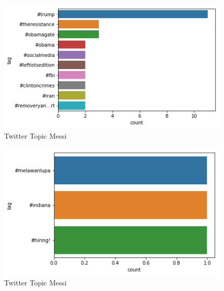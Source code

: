 \begin{figure}[htbp]\label{fig:twitter-out-3}
\centering
\includegraphics[width=1.0\textwidth]{images/twitter-trump-output.png}
\caption{Twitter Topic Messi}
\end{figure}


\begin{figure}[htbp]\label{fig:twitter-out-4}
\centering
\includegraphics[width=1.0\textwidth]{images/twitter-indiana-2.png}
\caption{Twitter Topic Messi}
\end{figure}
